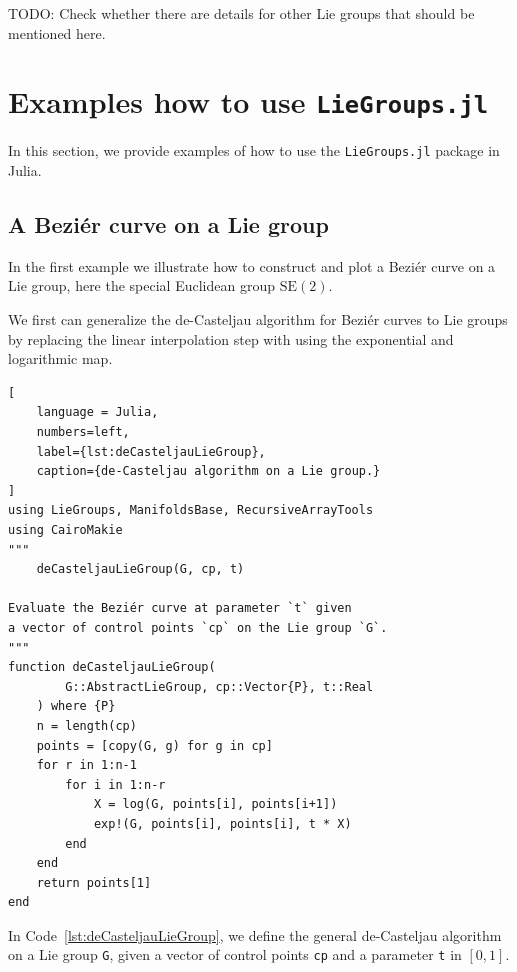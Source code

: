 \documentclass{juliacon}
\begin{document}
{\color{red}TODO: Check whether there are details for other Lie groups that should be mentioned here.}

\section{Examples how to use {\texttt{LieGroups.jl}}}%
\label{sec:Example}

In this section, we provide examples of how to use the {\texttt{LieGroups.jl}} package in Julia.

\subsection{A Beziér curve on a Lie group}

In the first example we illustrate how to construct and plot a Beziér curve on a Lie group, here the special Euclidean group \(\mathrm{SE}(2)\).

We first can generalize the de-Casteljau algorithm for Beziér curves to Lie groups by replacing the linear interpolation step with using the exponential and logarithmic map.

\begin{lstlisting}[
    language = Julia,
    numbers=left,
    label={lst:deCasteljauLieGroup},
    caption={de-Casteljau algorithm on a Lie group.}
]
using LieGroups, ManifoldsBase, RecursiveArrayTools
using CairoMakie
"""
    deCasteljauLieGroup(G, cp, t)

Evaluate the Beziér curve at parameter `t` given
a vector of control points `cp` on the Lie group `G`.
"""
function deCasteljauLieGroup(
        G::AbstractLieGroup, cp::Vector{P}, t::Real
    ) where {P}
    n = length(cp)
    points = [copy(G, g) for g in cp]
    for r in 1:n-1
        for i in 1:n-r
            X = log(G, points[i], points[i+1])
            exp!(G, points[i], points[i], t * X)
        end
    end
    return points[1]
end
\end{lstlisting}

In Code~\ref{lst:deCasteljauLieGroup}, we define the general de-Casteljau algorithm on a Lie group \verb|G|, given a vector of control points \verb|cp| and a parameter \verb|t| in \([0,1]\).
\end{document}
